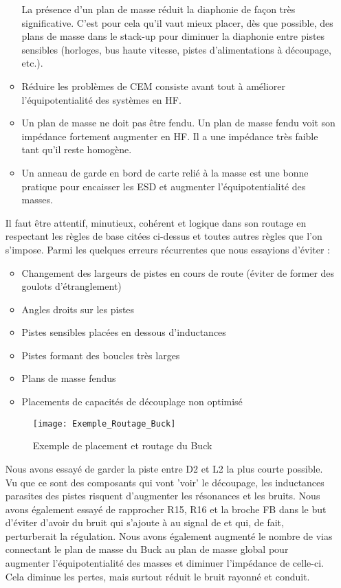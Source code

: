\begin{itemize}
\begin{itemize}
	      	      La présence d’un plan de masse réduit la diaphonie de façon très significative.
	      	      C’est pour cela qu’il vaut mieux placer, dès que possible, des plans de masse dans le stack-up pour diminuer la diaphonie entre pistes sensibles (horloges, bus haute vitesse, pistes d’alimentations à découpage, etc.).
	      	\item Réduire les problèmes de CEM consiste avant tout à améliorer l’équipotentialité des systèmes en HF.
	      	\item Un plan de masse ne doit pas être fendu.
	      	      Un plan de masse fendu voit son impédance fortement augmenter en HF. 
	      	      Il a une impédance très faible tant qu’il reste homogène.
	      	\item Un anneau de garde en bord de carte relié à la masse est une bonne pratique pour encaisser les ESD et augmenter l’équipotentialité des masses.
	      \end{itemize}
	          
	      Il faut être attentif, minutieux, cohérent et logique dans son routage en respectant les règles de base citées ci-dessus et toutes autres règles que l’on s’impose.
	      Parmi les quelques erreurs récurrentes que nous essayions d'éviter :
	      \begin{itemize}
	      	\item Changement des largeurs de pistes en cours de route (éviter de former des goulots d'étranglement)
	      	\item Angles droits sur les pistes
	      	\item Pistes sensibles placées en dessous d’inductances
	      	\item Pistes formant des boucles très larges
	      	\item Plans de masse fendus
	      	\item Placements de capacités de découplage non optimisé
	      \end{itemize}
	          
              
	      \begin{figure}[H]
	      	\begin{center}
	      		\texttt{[image: Exemple\_Routage\_Buck]}
	      	\end{center}
	      	\caption{Exemple de placement et routage du Buck}
	      \end{figure}
	          
	      Nous avons essayé de garder la piste entre D2 et L2 la plus courte possible. Vu que ce sont des composants qui vont 'voir' le découpage, les inductances parasites des pistes risquent d'augmenter les résonances et les bruits. 
	      Nous avons également essayé de rapprocher R15, R16 et la broche FB dans le but d'éviter d'avoir du bruit qui s'ajoute à au signal de  et qui, de fait, perturberait la régulation.
	      Nous avons également augmenté le nombre de vias connectant le plan de masse du Buck au plan de masse global pour augmenter l'équipotentialité des masses et diminuer l'impédance de celle-ci.
	      Cela diminue les pertes, mais surtout réduit le bruit rayonné et conduit.
	          

\end{itemize}
